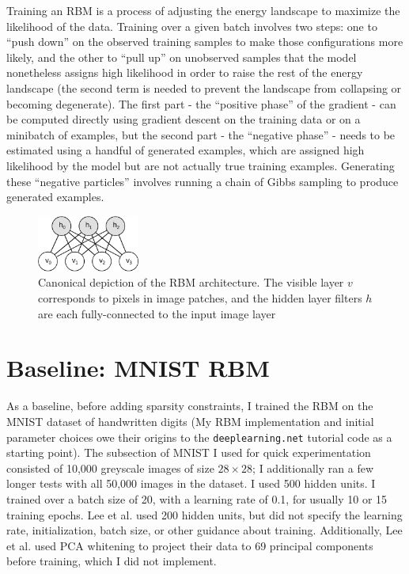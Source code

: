 \documentclass[12pt]{article}
\begin{document}
Training an RBM is a process of adjusting the energy landscape to maximize the likelihood of the data. Training over a given batch involves two steps: one to ``push down'' on the observed training samples to make those configurations more likely, and the other to ``pull up'' on unobserved samples that the model nonetheless assigns high likelihood in order to raise the rest of the energy landscape (the second term is needed to prevent the landscape from collapsing or becoming degenerate). The first part - the ``positive phase'' of the gradient - can be computed directly using gradient descent on the training data or on a minibatch of examples, but the second part - the ``negative phase'' - needs to be estimated using a handful of generated examples, which are assigned high likelihood by the model but are not actually true training examples. Generating these ``negative particles'' involves running a chain of Gibbs sampling to produce generated examples.

\begin{figure}[h]
  \centering
  \includegraphics[width=0.3\textwidth]{rbmfan.png}
  \caption{Canonical depiction of the RBM architecture. The visible layer $v$ corresponds to pixels in image patches, and the hidden layer filters $h$ are each fully-connected to the input image layer}
  \label{rbmfan}
\end{figure}

\section*{Baseline: MNIST RBM}

As a baseline, before adding sparsity constraints, I trained the RBM on the MNIST dataset of handwritten digits (My RBM implementation and initial parameter choices owe their origins to the \texttt{deeplearning.net} tutorial code as a starting point). The subsection of MNIST I used for quick experimentation consisted of 10,000 greyscale images of size $28 \times 28$; I additionally ran a few longer tests with all 50,000 images in the dataset. I used 500 hidden units. I trained over a batch size of 20, with a learning rate of 0.1, for usually 10 or 15 training epochs. Lee et al. used 200 hidden units, but did not specify the learning rate, initialization, batch size, or other guidance about training. Additionally, Lee et al. used PCA whitening to project their data to 69 principal components before training, which I did not implement.
\end{document}
